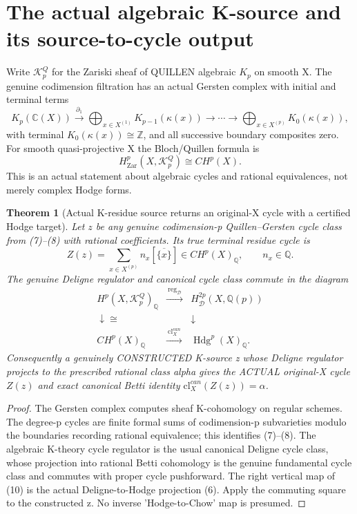 \documentclass[11pt]{article}
\newtheorem{theorem}{Theorem}[section]
\begin{document}
\section{The actual algebraic K-source and its source-to-cycle output}
Write $\mathcal K_p^Q$ for the Zariski sheaf of
QUILLEN algebraic $K_p$ on smooth X.
The genuine codimension filtration has an actual Gersten
complex with initial and terminal terms
\[
 \boxed{
 K_p(\mathbb C(X))
 \xrightarrow{\partial_1}
 \bigoplus_{x\in X^{(1)}} K_{p-1}(\kappa(x))
 \longrightarrow\cdots\longrightarrow
 \bigoplus_{x\in X^{(p)}}K_0(\kappa(x)),
 }                                                       \tag{7}
\]
with terminal $K_0(\kappa(x))\cong\mathbb Z$,
and all successive boundary composites zero.
For smooth quasi-projective X the Bloch/Quillen formula is
\[
 \boxed{H^p_{\mathrm{Zar}}(X,\mathcal K_p^Q)
                     \cong CH^p(X).}             \tag{8}
\]
This is an actual statement about algebraic cycles and
rational equivalences, not merely complex Hodge forms.

\begin{theorem}[Actual K-residue source returns an original-X cycle with a certified Hodge target]
Let $z$ be any genuine codimension-p Quillen--Gersten
cycle class from (7)--(8) with rational coefficients.
Its true terminal residue cycle is
\[
 Z(z)=\sum_{x\in X^{(p)}} n_x[\overline{\{x\}}]
       \in CH^p(X)_\mathbb Q,
 \qquad n_x\in\mathbb Q .
                                                               \tag{9}
\]
The genuine Deligne regulator and canonical cycle class
commute in the diagram
\[
 \begin{array}{ccc}
 H^p(X,\mathcal K_p^Q)_\mathbb Q
  &\xrightarrow{\ \operatorname{reg}_{\mathcal D}\ }&
             H_{\mathcal D}^{2p}(X,\mathbb Q(p))\\
 \downarrow\cong &&\downarrow\\
 CH^p(X)_\mathbb Q
  &\xrightarrow{\ \mathrm{cl}^{can}_X\ }&
             \operatorname{Hdg}^p(X)_\mathbb Q .
 \end{array}                                             \tag{10}
\]
Consequently a genuinely CONSTRUCTED K-source z
whose Deligne regulator projects to the
prescribed rational class alpha gives the ACTUAL
original-X cycle $Z(z)$ and exact canonical Betti
identity $\mathrm{cl}^{can}_X(Z(z))=\alpha$.
\end{theorem}
\begin{proof}
The Gersten complex computes sheaf K-cohomology
on regular schemes. The degree-p cycles are finite
formal sums of codimension-p subvarieties modulo the
boundaries recording rational equivalence; this
identifies (7)--(8).
The algebraic K-theory cycle regulator is the
usual canonical Deligne cycle class, whose
projection into rational Betti cohomology is
the genuine fundamental cycle class and commutes
with proper cycle pushforward.
The right vertical map of (10) is the actual
Deligne-to-Hodge projection (6).
Apply the commuting square to the constructed z.
No inverse 'Hodge-to-Chow' map is presumed.
\end{proof}
\end{document}
